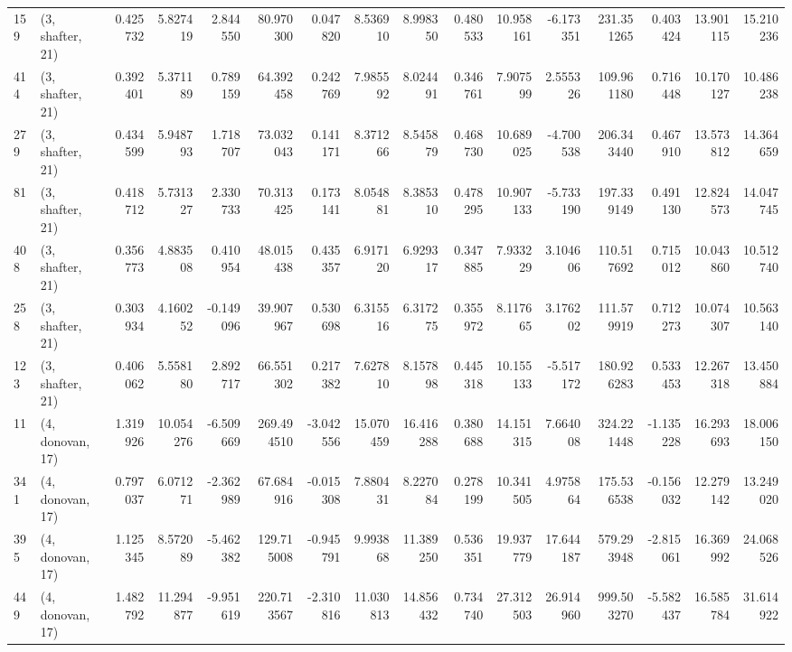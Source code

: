 \begin{tabular}{llrrrrrrrrrrrrrr}
159 &  (3, shafter, 21) &   0.425732 &   5.827419 &   2.844550 &    80.970300 &   0.047820 &   8.536910 &   8.998350 &  0.480533 &  10.958161 &  -6.173351 &   231.351265 &  0.403424 &  13.901115 &  15.210236 \\
414 &  (3, shafter, 21) &   0.392401 &   5.371189 &   0.789159 &    64.392458 &   0.242769 &   7.985592 &   8.024491 &  0.346761 &   7.907599 &   2.555326 &   109.961180 &  0.716448 &  10.170127 &  10.486238 \\
279 &  (3, shafter, 21) &   0.434599 &   5.948793 &   1.718707 &    73.032043 &   0.141171 &   8.371266 &   8.545879 &  0.468730 &  10.689025 &  -4.700538 &   206.343440 &  0.467910 &  13.573812 &  14.364659 \\
81  &  (3, shafter, 21) &   0.418712 &   5.731327 &   2.330733 &    70.313425 &   0.173141 &   8.054881 &   8.385310 &  0.478295 &  10.907133 &  -5.733190 &   197.339149 &  0.491130 &  12.824573 &  14.047745 \\
408 &  (3, shafter, 21) &   0.356773 &   4.883508 &   0.410954 &    48.015438 &   0.435357 &   6.917120 &   6.929317 &  0.347885 &   7.933229 &   3.104606 &   110.517692 &  0.715012 &  10.043860 &  10.512740 \\
258 &  (3, shafter, 21) &   0.303934 &   4.160252 &  -0.149096 &    39.907967 &   0.530698 &   6.315516 &   6.317275 &  0.355972 &   8.117665 &   3.176202 &   111.579919 &  0.712273 &  10.074307 &  10.563140 \\
123 &  (3, shafter, 21) &   0.406062 &   5.558180 &   2.892717 &    66.551302 &   0.217382 &   7.627810 &   8.157898 &  0.445318 &  10.155133 &  -5.517172 &   180.926283 &  0.533453 &  12.267318 &  13.450884 \\
11  &  (4, donovan, 17) &   1.319926 &  10.054276 &  -6.509669 &   269.494510 &  -3.042556 &  15.070459 &  16.416288 &  0.380688 &  14.151315 &   7.664008 &   324.221448 & -1.135228 &  16.293693 &  18.006150 \\
341 &  (4, donovan, 17) &   0.797037 &   6.071271 &  -2.362989 &    67.684916 &  -0.015308 &   7.880431 &   8.227084 &  0.278199 &  10.341505 &   4.975864 &   175.536538 & -0.156032 &  12.279142 &  13.249020 \\
395 &  (4, donovan, 17) &   1.125345 &   8.572089 &  -5.462382 &   129.715008 &  -0.945791 &   9.993868 &  11.389250 &  0.536351 &  19.937779 &  17.644187 &   579.293948 & -2.815061 &  16.369992 &  24.068526 \\
449 &  (4, donovan, 17) &   1.482792 &  11.294877 &  -9.951619 &   220.713567 &  -2.310816 &  11.030813 &  14.856432 &  0.734740 &  27.312503 &  26.914960 &   999.503270 & -5.582437 &  16.585784 &  31.614922 \\

\end{tabular}
